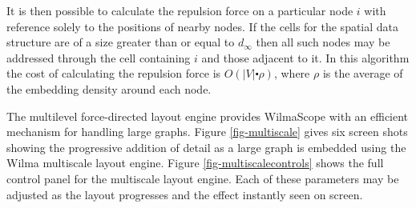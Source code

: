 \documentclass[runningheads]{cl2emult}
\begin{document}
It is then possible to calculate the repulsion force on a particular node $i$
with reference solely to the positions of nearby nodes.  If the cells for
the spatial data structure are of a size greater than or equal to $d_\infty$
then all such nodes may be addressed through the cell containing $i$ and
those adjacent to it.  In this algorithm the cost of calculating the
repulsion force is $O(|V| \centerdot \rho)$, where $\rho$ is the average 
of the embedding density around each node.

The multilevel force-directed layout engine provides WilmaScope with
an efficient mechanism for handling large graphs.  Figure
\ref{fig-multiscale} gives six screen shots showing the progressive
addition of detail as a large graph is embedded using the Wilma multiscale
layout engine.  Figure \ref{fig-multiscalecontrols} shows the full
control panel for the multiscale layout engine.  Each of these
parameters may be adjusted as the layout progresses and the effect
instantly seen on screen.
\end{document}
